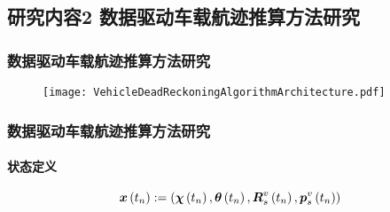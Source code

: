 

\subsection{研究内容2 数据驱动车载航迹推算方法研究}

\begin{frame}
	\frametitle{数据驱动车载航迹推算方法研究} 
   	\begin{figure}
   	\centering
   	    \texttt{[image: VehicleDeadReckoningAlgorithmArchitecture.pdf]}
   	\end{figure} 
\end{frame}

\begin{frame}
	\frametitle{数据驱动车载航迹推算方法研究}	
	\framesubtitle{状态定义}	
	\begin{equation*}
	   	\vb*{x}\left(t_n\right) := \left( \vb*{\chi}\left(t_n\right), \vb*{\theta}\left(t_n\right), \vb*{R}_s^v\left(t_n\right), \vb*{p}_s^v\left(t_n\right)\right) 
	   	\label{eq:InvariantExtendedKalmanFilterPedestrianState}
	\end{equation*} 
\end{frame}

